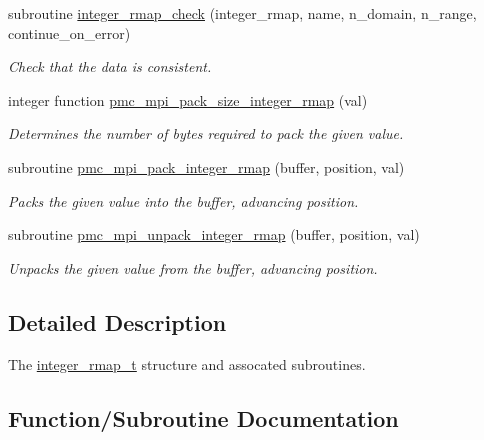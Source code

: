\begin{DoxyCompactItemize}
subroutine \mbox{\hyperlink{namespacepmc__integer__rmap_ada6b75ea8b1fbe6d86029e707fa4dcaa}{integer\+\_\+rmap\+\_\+check}} (integer\+\_\+rmap, name, n\+\_\+domain, n\+\_\+range, continue\+\_\+on\+\_\+error)
\begin{DoxyCompactList}\small\item\em Check that the data is consistent. \end{DoxyCompactList}\item 
integer function \mbox{\hyperlink{namespacepmc__integer__rmap_abea71acd80972ef2286adaf3a124b1c0}{pmc\+\_\+mpi\+\_\+pack\+\_\+size\+\_\+integer\+\_\+rmap}} (val)
\begin{DoxyCompactList}\small\item\em Determines the number of bytes required to pack the given value. \end{DoxyCompactList}\item 
subroutine \mbox{\hyperlink{namespacepmc__integer__rmap_a3fe52c5b53b166a04a637aa40a1250ef}{pmc\+\_\+mpi\+\_\+pack\+\_\+integer\+\_\+rmap}} (buffer, position, val)
\begin{DoxyCompactList}\small\item\em Packs the given value into the buffer, advancing position. \end{DoxyCompactList}\item 
subroutine \mbox{\hyperlink{namespacepmc__integer__rmap_a3603985157c28d502225dd090ff2f44a}{pmc\+\_\+mpi\+\_\+unpack\+\_\+integer\+\_\+rmap}} (buffer, position, val)
\begin{DoxyCompactList}\small\item\em Unpacks the given value from the buffer, advancing position. \end{DoxyCompactList}\end{DoxyCompactItemize}


\subsection{Detailed Description}
The \mbox{\hyperlink{structpmc__integer__rmap_1_1integer__rmap__t}{integer\+\_\+rmap\+\_\+t}} structure and assocated subroutines. 

\subsection{Function/\+Subroutine Documentation}
\mbox{\label{namespacepmc__integer__rmap_a0f7f546f381ee5750d589783bb7e1d89}} 
